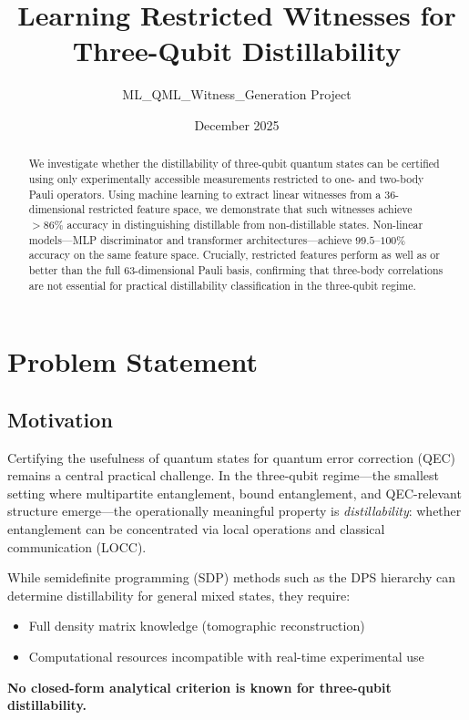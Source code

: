 \documentclass[11pt,a4paper]{article}
\title{Learning Restricted Witnesses for Three-Qubit Distillability}
\author{ML\_QML\_Witness\_Generation Project}
\date{December 2025}
\begin{document}
\maketitle

\begin{abstract}
We investigate whether the distillability of three-qubit quantum states can be certified using only experimentally accessible measurements restricted to one- and two-body Pauli operators. Using machine learning to extract linear witnesses from a 36-dimensional restricted feature space, we demonstrate that such witnesses achieve $>86\%$ accuracy in distinguishing distillable from non-distillable states. Non-linear models---MLP discriminator and transformer architectures---achieve $99.5$--$100\%$ accuracy on the same feature space. Crucially, restricted features perform as well as or better than the full 63-dimensional Pauli basis, confirming that three-body correlations are not essential for practical distillability classification in the three-qubit regime.
\end{abstract}

\section{Problem Statement}

\subsection{Motivation}

Certifying the usefulness of quantum states for quantum error correction (QEC) remains a central practical challenge. In the three-qubit regime---the smallest setting where multipartite entanglement, bound entanglement, and QEC-relevant structure emerge---the operationally meaningful property is \emph{distillability}: whether entanglement can be concentrated via local operations and classical communication (LOCC).

While semidefinite programming (SDP) methods such as the DPS hierarchy can determine distillability for general mixed states, they require:
\begin{itemize}
    \item Full density matrix knowledge (tomographic reconstruction)
    \item Computational resources incompatible with real-time experimental use
\end{itemize}

\noindent\textbf{No closed-form analytical criterion is known for three-qubit distillability.}
\end{document}

